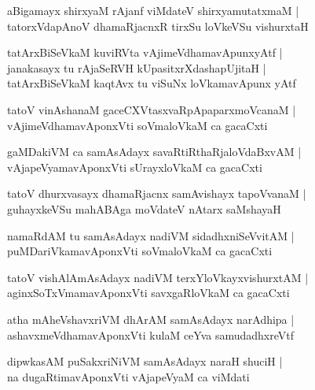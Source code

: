 \documentclass[twoside,12pt,openright]{book}
\newcounter{shloka}[chapter]
\begin{document}
\begin{shloka}
aBigamayx shirxyaM rAjanf viMdateV shirxyamutatxmaM |\\
tatorxVdapAnoV dhamaRjacnxR tirxSu loVkeVSu vishurxtaH 
\end{shloka}

\begin{shloka}
tatArxBiSeVkaM kuviRVta vAjimeVdhamavApunxyAtf |\\
janakasayx tu rAjaSeRVH kUpasitxrXdashapUjitaH |\\
tatArxBiSeVkaM kaqtAvx tu viSuNx loVkamavApunx yAtf 
\end{shloka}

\begin{shloka}
tatoV vinAshanaM gaceCXVtasxvaRpApaparxmoVcanaM |\\
vAjimeVdhamavAponxVti soVmaloVkaM ca gacaCxti 
\end{shloka}

\begin{shloka}
gaMDakiVM ca samAsAdayx savaRtiRthaRjaloVdaBxvAM |\\
vAjapeVyamavAponxVti sUrayxloVkaM ca gacaCxti
\end{shloka}

\begin{shloka}
tatoV dhurxvasayx dhamaRjacnx samAvishayx tapoVvanaM |\\
guhayxkeVSu mahABAga moVdateV nAtarx saMshayaH 
\end{shloka}

\begin{shloka}
namaRdAM tu samAsAdayx nadiVM sidadhxniSeVvitAM |\\
puMDariVkamavAponxVti soVmaloVkaM ca gacaCxti 
\end{shloka}

\begin{shloka}
tatoV vishAlAmAsAdayx nadiVM terxYloVkayxvishurxtAM |\\
aginxSoTxVmamavAponxVti savxgaRloVkaM ca gacaCxti 
\end{shloka}

\begin{shloka}
atha mAheVshavxriVM dhArAM samAsAdayx narAdhipa |\\
ashavxmeVdhamavAponxVti kulaM ceYva samudadhxreVtf 
\end{shloka}

\begin{shloka}
dipwkasAM puSakxriNiVM samAsAdayx naraH shuciH |\\
na dugaRtimavAponxVti vAjapeVyaM ca viMdati
\end{shloka}
\end{document}
